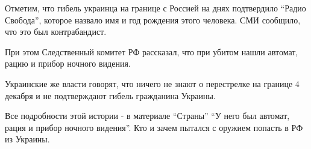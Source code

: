 Отметим, что гибель украинца на границе с Россией на днях подтвердило
\enquote{Радио Свобода}, которое назвало имя и год рождения этого
человека.
СМИ сообщило, что это был контрабандист. 

При этом Следственный комитет РФ рассказал, что при убитом нашли автомат, рацию
и прибор ночного видения. 

Украинские же власти говорят, что ничего не знают о перестрелке на границе 4
декабря и не подтверждают гибель гражданина Украины. 

Все подробности этой истории - в материале \enquote{Страны} 
\enquote{У него был автомат, рация и прибор ночного видения}. Кто и зачем пытался с оружием попасть в РФ из
Украины.
